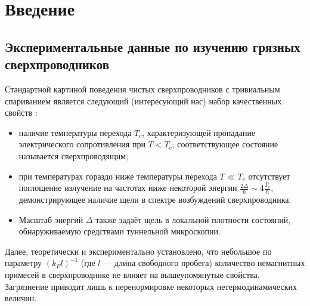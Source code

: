 \chapter{Введение}
\section{Экспериментальные данные по изучению грязных сверхпроводников}
Стандартной картиной поведения чистых сверхпроводников с тривиальным спариванием является следующий (интересующий нас) набор качественных свойств \cite{deZhen}:
\begin{itemize}
	\item наличие температуры перехода $T_c$, характеризующей пропадание электрического сопротивления при $T < T_c$; соответствующее состояние называется сверхпроводящим;
	\item при температурах гораздо ниже температуры перехода $T \ll T_c$ отсутствует поглощение излучение на частотах ниже некоторой энергии $\frac{2 \Delta}{\hbar} \sim 4 \frac{T_c}{\hbar}$, демонстрирующее наличие щели в спектре возбуждений сверхпроводника.
	\item Масштаб энергий $\Delta$ также задаёт щель в локальной плотности состояний, обнаруживаемую средствами туннельной микроскопии.
\end{itemize}
Далее, теоретически \cite{LSh_FG} и экспериментально \cite{Cheng_2016} установлено, что небольшое по параметру $(k_F l)^{-1}$ (где $l$ --- длина свободного пробега) количество немагнитных примесей в сверхпроводнике не влияет на вышеупомянутые свойства. Загрязнение приводит лишь к перенормировке некоторых нетермодинамических величин.

